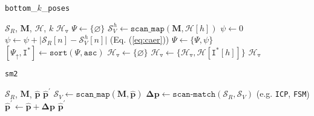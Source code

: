 \begin{algorithm}
  \caption{\texttt{bottom}\_$k$\_\texttt{poses}}
  \begin{spacing}{1.2}
  \begin{algorithmic}[1]
    \REQUIRE $\mathcal{S}_R$, $\bm{M}$, $\mathcal{H}$, $k$
    \ENSURE $\mathcal{H}_{\triangledown}$
    \STATE $\Psi \leftarrow \{\varnothing \}$
      \STATE $\mathcal{S}_V^{\hspace{1pt} h} \leftarrow \texttt{scan\_map}(\bm{M}, \mathcal{H}[h])$
      \STATE $\psi \leftarrow 0$
        \STATE $\psi \leftarrow \psi + \big|\mathcal{S}_R[n]-\mathcal{S}_V^{\hspace{1pt} h}[n]\big|$ \hfill {\small (Eq. (\ref{eq:caer})})
      \ENDFOR
      \STATE $\Psi \leftarrow \{\Psi, \psi\}$
    \ENDFOR
    \STATE $[\Psi_{\uparrow}, \texttt{I}^{\ast}] \leftarrow \texttt{sort}(\Psi, \texttt{asc})$
    \STATE $\mathcal{H}_{\triangledown} \leftarrow \{\varnothing \}$
      \STATE $\mathcal{H}_{\triangledown} \leftarrow \{\mathcal{H}_{\triangledown}, \mathcal{H}[\texttt{I}^{\ast}[h]]\}$
    \ENDFOR
    \RETURN $\mathcal{H}_{\triangledown}$
  \end{algorithmic}
  \end{spacing}
  \label{alg:bottom_k}
\end{algorithm}

\begin{algorithm}
  \caption{\texttt{sm2}}
  \begin{spacing}{1.2}
  \begin{algorithmic}[1]
    \REQUIRE $\mathcal{S}_R$, $\bm{M}$, $\hat{\bm{p}}$
    \ENSURE $\hat{\bm{p}}^\prime$
    \STATE $\mathcal{S}_V \leftarrow \texttt{scan\_map}(\bm{M}, \hat{\bm{p}})$
    \STATE $\bm{\Delta p} \leftarrow \texttt{scan-match}(\mathcal{S}_R,\mathcal{S}_V)$ \hfill {\small (e.g. \texttt{ICP}\cite{Vizzo2023}, \texttt{FSM}\cite{Filotheou2022f}})
    \STATE $\hat{\bm{p}}^\prime \leftarrow \hat{\bm{p}} + \bm{\Delta p}$
    \RETURN $\hat{\bm{p}}^\prime$
  \end{algorithmic}
  \end{spacing}
  \label{alg:sm2}
\end{algorithm}



